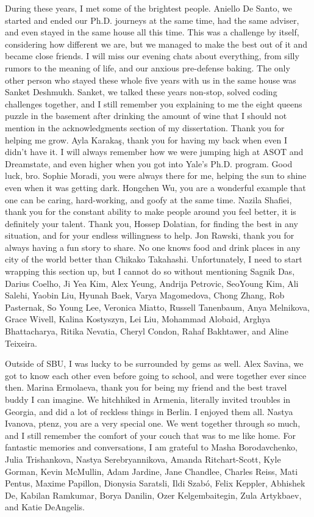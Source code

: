 {During these years, I met some of the brightest people.
Aniello De Santo, we started and ended our Ph.D. journeys at the same time, had the same adviser, and even stayed in the same house all this time.
This was a challenge by itself, considering how different we are, but we managed to make the best out of it and became close friends.
I will miss our evening chats about everything, from silly rumors to the meaning of life, and our anxious pre-defense baking.
The only other person who stayed these whole five years with us in the same house was Sanket Deshmukh.
Sanket, we talked these years non-stop, solved coding challenges together, and I still remember you explaining to me the eight queens puzzle in the basement after drinking the amount of wine that I should not mention in the acknowledgments section of my dissertation.
Thank you for helping me grow.
Ayla Karaka\c{s}, thank you for having my back when even I didn't have it.
I will always remember how we were jumping high at ASOT and Dreamstate, and even higher when you got into Yale's Ph.D. program.
Good luck, bro.
Sophie Moradi, you were always there for me, helping the sun to shine even when it was getting dark.
Hongchen Wu, you are a wonderful example that one can be caring, hard-working, and goofy at the same time.
Nazila Shafiei, thank you for the constant ability to make people around you feel better, it is definitely your talent.
Thank you, Hossep Dolatian, for finding the best in any situation, and for your endless willingness to help.
Jon Rawski, thank you for always having a fun story to share.
No one knows food and drink places in any city of the world better than Chikako Takahashi.
Unfortunately, I need to start wrapping this section up, but I cannot do so without mentioning Sagnik Das, Darius Coelho, Ji Yea Kim, Alex Yeung, Andrija Petrovic, SeoYoung Kim, Ali Salehi, Yaobin Liu, Hyunah Baek, Varya Magomedova, Chong Zhang, Rob Pasternak, So Young Lee, Veronica Miatto, Russell Tanenbaum, Anya Melnikova, Grace Wivell, Kalina Kostyszyn, Lei Liu, Mohammad Alobaid, Arghya Bhattacharya, Ritika Nevatia, Cheryl Condon, Rahaf Bakhtawer, and Aline Teixeira.

Outside of SBU, I was lucky to be surrounded by gems as well.
Alex Savina, we got to know each other even before going to school, and were together ever since then.
Marina Ermolaeva, thank you for being my friend and the best travel buddy I can imagine.
We hitchhiked in Armenia, literally invited troubles in Georgia, and did a lot of reckless things in Berlin.
I enjoyed them all.
Nastya Ivanova, ptenz, you are a very special one.
We went together through so much, and I still remember the comfort of your couch that was to me like home.
For fantastic memories and conversations, I am grateful to Masha Borodavchenko, Julia Trishankova, Nastya Serebryannikova, Amanda Ritchart-Scott, Kyle Gorman, Kevin McMullin, Adam Jardine, Jane Chandlee, Charles Reiss, Mati Pentus, Maxime Papillon, Dionysia Saratsli, Ildi Szab\'o, Felix Keppler, Abhishek De, Kabilan Ramkumar, Borya Danilin, Ozer Kelgembaitegin, Zula Artykbaev, and Katie DeAngelis.

}
